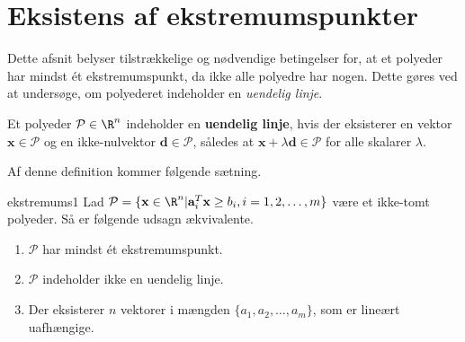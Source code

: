 \section{Eksistens af ekstremumspunkter}
%
Dette afsnit belyser tilstrækkelige og nødvendige betingelser for, at et polyeder har mindst ét ekstremumspunkt, da ikke alle polyedre har nogen.
Dette gøres ved at undersøge, om polyederet indeholder en \textit{uendelig linje}.
%
\begin{defn}{}{}
Et polyeder $\mathcal{P} \in \R^n$ indeholder en \textbf{uendelig linje}, hvis der eksisterer en vektor $\textbf{x} \in \mathcal{P}$ og en ikke-nulvektor $\textbf{d} \in \mathcal{P}$, således at $\textbf{x} + \lambda \textbf{d} \in \mathcal{P}$ for alle skalarer $\lambda$.
\end{defn}
\noindent
%
Af denne definition kommer følgende sætning.
%
\begin{thm}{}{ekstremums1}
Lad $\mathcal{P} = \{\textbf{x} \in \R^n | \textbf{a}_i^T\textbf{x} \geq b_i, i = 1,2,\ldots,m  \}$ være et ikke-tomt polyeder.
Så er følgende udsagn ækvivalente.
%
\begin{enumerate}[label = (\alph*)]
\item $\mathcal{P}$ har mindst ét ekstremumspunkt.
\item $\mathcal{P}$ indeholder ikke en uendelig linje.
\item Der eksisterer $n$ vektorer i mængden $\{a_1, a_2, \ldots ,a_m \}$, som er lineært uafhængige.
\end{enumerate}
\end{thm}
%
